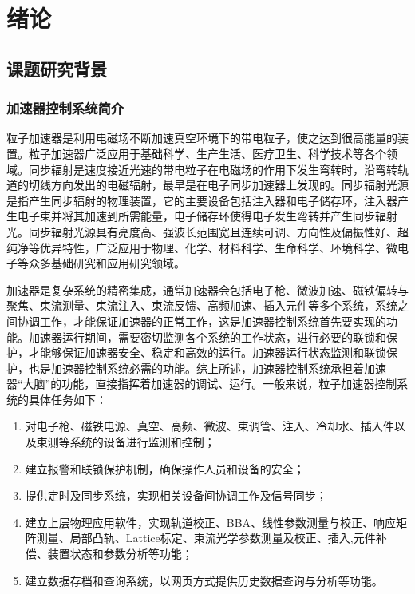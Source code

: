 
\chapter{绪论}

\section{课题研究背景}

\subsection{加速器控制系统简介}
粒子加速器是利用电磁场不断加速真空环境下的带电粒子，使之达到很高能量的装置。粒子加速器广泛应用于基础科学、生产生活、医疗卫生、科学技术等各个领域\cite{hong2014,Clayton2015}。同步辐射是速度接近光速的带电粒子在电磁场的作用下发生弯转时，沿弯转轨道的切线方向发出的电磁辐射，最早是在电子同步加速器上发现的。同步辐射光源是指产生同步辐射的物理装置，它的主要设备包括注入器和电子储存环，注入器产生电子束并将其加速到所需能量，电子储存环使得电子发生弯转并产生同步辐射光。同步辐射光源具有亮度高、强波长范围宽且连续可调、方向性及偏振性好、超纯净等优异特性，广泛应用于物理、化学、材料科学、生命科学、环境科学、微电子等众多基础研究和应用研究领域。

加速器是复杂系统的精密集成，通常加速器会包括电子枪、微波加速、磁铁偏转与聚焦、束流测量、束流注入、束流反馈、高频加速、插入元件等多个系统，系统之间协调工作，才能保证加速器的正常工作，这是加速器控制系统首先要实现的功能。加速器运行期间，需要密切监测各个系统的工作状态，进行必要的联锁和保护，才能够保证加速器安全、稳定和高效的运行。加速器运行状态监测和联锁保护，也是加速器控制系统必需的功能。综上所述，加速器控制系统承担着加速器“大脑”的功能，直接指挥着加速器的调试、运行。一般来说，粒子加速器控制系统的具体任务如下\cite{zhao2006,Liu2006}：

\begin{enumerate}[itemindent=1em,label=(\arabic*)]
	\item 对电子枪、磁铁电源、真空、高频、微波、束调管、注入、冷却水、插入件以及束测等系统的设备进行监测和控制；
	\item 建立报警和联锁保护机制，确保操作人员和设备的安全；
	\item 提供定时及同步系统，实现相关设备间协调工作及信号同步；
	\item 建立上层物理应用软件，实现轨道校正、BBA、线性参数测量与校正、响应矩阵测量、局部凸轨、Lattice标定、束流光学参数测量及校正、插入,元件补偿、装置状态和参数分析等功能；
	\item 建立数据存档和查询系统，以网页方式提供历史数据查询与分析等功能。
\end{enumerate}

